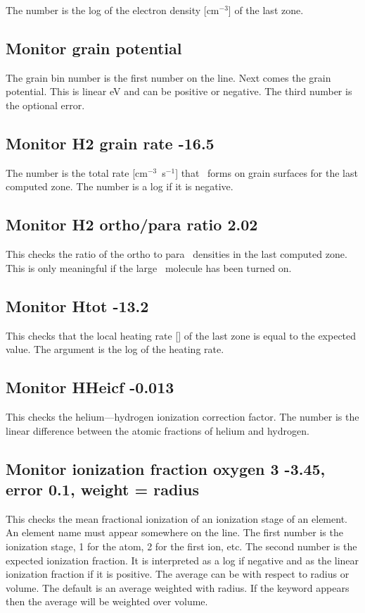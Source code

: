 The number is the log of the electron density [cm$^{-3}$] of the last zone.

\subsection{Monitor grain potential}

The grain bin number is the first number on the line.  Next comes the
grain potential.
This is linear eV and can be positive or negative.
The third number is the optional error.

\subsection{Monitor H2 grain rate -16.5}

The number is the total rate [cm$^{-3}$~s$^{-1}$] that \htwo\ forms on grain surfaces
for the last computed zone.
The number is a log if it is negative.

\subsection{Monitor H2 ortho/para ratio 2.02}

This checks the ratio of the ortho to para \htwo\ densities in the last
computed zone.
This is only meaningful if the large \htwo\ molecule has been
turned on.

\subsection{Monitor Htot -13.2}

This checks that the local heating rate [\ergpccmps ]
of the last zone is equal to the expected value.
The argument is the log of the heating rate.

\subsection{Monitor HHeicf -0.013}

This checks the helium---hydrogen ionization correction factor.
The number is the linear difference between the atomic fractions
of helium and hydrogen.

\subsection{Monitor ionization fraction oxygen 3 -3.45, error 0.1, weight =
radius}

This checks the mean fractional ionization of an ionization stage of
an element.
An element name must appear somewhere on the line.
The first
number is the ionization stage, 1 for the atom, 2 for the first ion, etc.
The second number is the expected ionization fraction.
It is interpreted
as a log if negative and as the linear ionization fraction if it is positive.
The average can be with respect to radius or volume.
The default is an
average weighted with radius.
If the keyword  appears then the average
will be weighted over volume.

